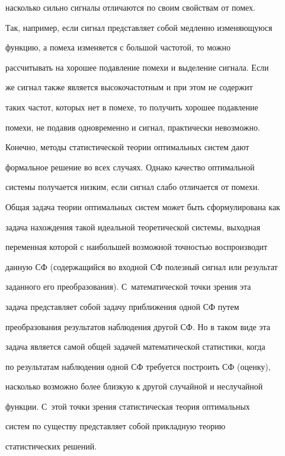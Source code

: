 насколько сильно сигналы отличаются по своим свойствам от помех.


Так, например, если сигнал пред\-став\-ля\-ет собой медленно изменяющуюся


функцию, а помеха изменяется с большой частотой, то можно


рассчитывать на хорошее подавление помехи и выделение сигнала. Если


же сигнал также является высокочастотным и при этом не содержит


таких частот, которых нет в помехе, то получить хорошее подавление


помехи, не подавив одновременно и сигнал, практически невозможно.


Конечно, методы статистической теории оптимальных систем дают


формальное решение во всех случаях. Однако качество оптимальной


системы получается низким, если сигнал слабо отличается от помехи.





Общая задача теории оптимальных систем может быть сформулирована как


задача нахождения такой  идеальной теоретической системы, выходная


переменная которой с наибольшей возможной точностью воспроизводит


данную СФ (содержащийся во входной СФ полезный  сигнал или результат


заданного его преобразования). С~математической точки зрения эта


задача представляет собой задачу приближения одной СФ путем


преобразования результатов наблюдения другой СФ. Но в таком виде эта


задача является самой общей задачей математической статистики, когда


по  результатам наблюдения одной СФ требуется построить СФ (оценку),


насколько возможно более близкую к другой случайной и неслучайной


функции. С~этой точки зрения статистическая теория оптимальных


систем по существу представляет собой прикладную тео\-рию


статистических решений.





